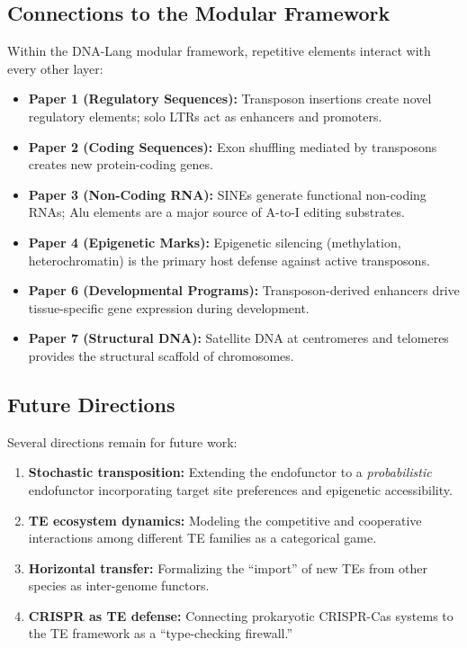 \documentclass[12pt,a4paper]{article}
\begin{document}
\subsection{Connections to the Modular Framework}

Within the DNA-Lang modular framework, repetitive elements interact with every other
layer:

\begin{itemize}
  \item \textbf{Paper 1 (Regulatory Sequences):} Transposon insertions create novel
    regulatory elements; solo LTRs act as enhancers and promoters.
  \item \textbf{Paper 2 (Coding Sequences):} Exon shuffling mediated by transposons
    creates new protein-coding genes.
  \item \textbf{Paper 3 (Non-Coding RNA):} SINEs generate functional non-coding RNAs;
    Alu elements are a major source of A-to-I editing substrates.
  \item \textbf{Paper 4 (Epigenetic Marks):} Epigenetic silencing (methylation,
    heterochromatin) is the primary host defense against active transposons.
  \item \textbf{Paper 6 (Developmental Programs):} Transposon-derived enhancers drive
    tissue-specific gene expression during development.
  \item \textbf{Paper 7 (Structural DNA):} Satellite DNA at centromeres and telomeres
    provides the structural scaffold of chromosomes.
\end{itemize}

\subsection{Future Directions}

Several directions remain for future work:

\begin{enumerate}[label=\arabic*.]
  \item \textbf{Stochastic transposition:} Extending the endofunctor to a \emph{probabilistic}
    endofunctor incorporating target site preferences and epigenetic accessibility.
  \item \textbf{TE ecosystem dynamics:} Modeling the competitive and cooperative
    interactions among different TE families as a categorical game.
  \item \textbf{Horizontal transfer:} Formalizing the ``import'' of new TEs from other
    species as inter-genome functors.
  \item \textbf{CRISPR as TE defense:} Connecting prokaryotic CRISPR-Cas systems to
    the TE framework as a ``type-checking firewall.''
\end{enumerate}
\end{document}
